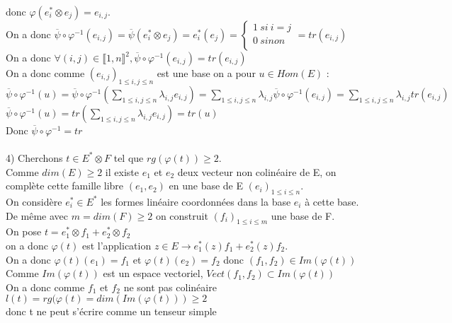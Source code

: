 \documentclass{article}
\begin{document}
donc $\varphi(e^\ast_i \otimes e_{j})= e_{i,j}$. \\
On a donc $\overline{\psi} \circ \varphi^{-1}(e_{i,j})= \overline{\psi}(e^\ast_i \otimes e_{j})=e^*_i(e_j)=\begin{cases}
1 \ si \ i=j \\
0 \ sinon \\
\end{cases}=tr(e_{i,j})$ \\
On a donc $\forall (i,j) \in \llbracket1,n\rrbracket^2,\overline{\psi} \circ \varphi^{-1}(e_{i,j})=tr(e_{i,j})$ \\
On a donc comme $(e_{i,j})_{ 1 \leq i,j \leq n}$ est une base on a pour $u \in Hom(E)$ : \\
$\overline{\psi} \circ \varphi^{-1}(u)=\overline{\psi} \circ \varphi^{-1}(\sum_{ 1 \leq i,j\leq n} \lambda_{i,j} e_{i,j})=\sum_{ 1 \leq i,j\leq n} \lambda_{i,j}\overline{\psi} \circ \varphi^{-1}(e_{i,j})=\sum_{ 1 \leq i,j\leq n}\lambda_{i,j} tr(e_{i,j})$ \\
$\overline{\psi} \circ \varphi^{-1}(u)= tr(\sum_{ 1 \leq i,j\leq n}\lambda_{i,j} e_{i,j})=tr(u)$ \\
Donc $\overline{\psi} \circ \varphi^{-1}=tr$ \\
\\
4) Cherchons $t\in E^* \otimes F$ tel que $rg(\varphi(t))\geq 2$. \\
Comme $dim(E)\geq 2$ il existe $e_1$ et $e_2$ deux vecteur non colinéaire de E, on complète cette famille libre $(e_1,e_2)$ en une base de E $(e_i)_{1\leq i \leq n}$.  \\
On considère $e^*_i \in E^*$ les formes linéaire coordonnées dans la base $e_i$ à cette base. \\
De même avec $m=dim(F) \geq 2$ on construit $(f_i)_{1\leq i \leq m}$ une base de F. \\
On pose $t=e^*_1 \otimes f_1 + e^*_2 \otimes f_2$ \\
on a donc $\varphi(t)$ est l'application $z \in E \rightarrow e^*_1(z) f_1 + e^*_2(z) f_2$. \\
On a donc $\varphi(t)(e_1)=f_1$ et $\varphi(t)(e_2)=f_2$ donc $(f_1,f_2) \in Im(\varphi(t))$ \\
Comme $Im(\varphi(t))$ est un espace vectoriel, $Vect(f_1,f_2) \subset Im(\varphi(t))$ \\
On a donc comme $f_1$ et $f_2$ ne sont pas colinéaire $l(t)=rg(\varphi(t)=dim(Im(\varphi(t))) \geq 2$ \\
donc t ne peut s'écrire comme un tenseur simple
\end{document}
